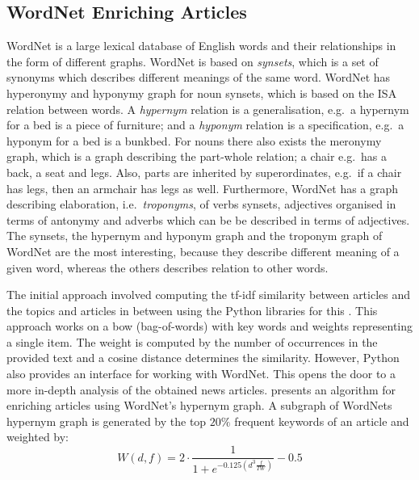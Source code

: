 \subsection{WordNet Enriching Articles}
WordNet is a large lexical database of English words and their relationships in the form of different graphs. WordNet is based on \emph{synsets}, which is a set of synonyms which describes different meanings of the same word. WordNet has hyperonymy and hyponymy graph for noun synsets, which is based on the ISA relation between words. A \emph{hypernym} relation is a generalisation, e.g.\ a hypernym for a bed is a piece of furniture; and a \emph{hyponym} relation is a specification, e.g.\ a hyponym for a bed is a bunkbed. For nouns there also exists the meronymy graph, which is a graph describing the part-whole relation; a chair e.g.\ has a back, a seat and legs. Also, parts are inherited by superordinates, e.g.\ if a chair has legs, then an armchair has legs as well. Furthermore, WordNet has a graph describing elaboration, i.e.\ \emph{troponyms}, of verbs synsets, adjectives organised in terms of antonymy and adverbs which can be be described in terms of adjectives. The synsets, the hypernym and hyponym graph and the troponym graph of WordNet are the most interesting, because they describe different meaning of a given word, whereas the others describes relation to other words.

The initial approach involved computing the tf-idf similarity between articles and the topics and articles in between using the Python libraries for this \cite{NLTK}. This approach works on a bow (bag-of-words) with key words and weights representing a single item. The weight is computed by the number of occurrences in the provided text and a cosine distance determines the similarity. However, Python also provides an interface for working with WordNet. This opens the door to a more in-depth analysis of the obtained news articles. \cite{116262780379.pdf} presents an algorithm for enriching articles using WordNet's hypernym graph. A subgraph of WordNets hypernym graph is generated by the top $20\%$ frequent keywords of an article and weighted by:
$$W(d, f) = 2 \cdot \frac{1}{1+e^{-0.125(d^3\frac{f}{TW})}}-0.5$$

